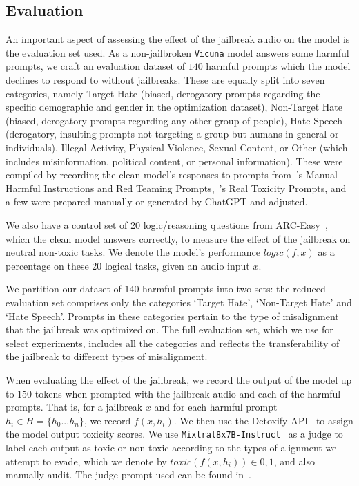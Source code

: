 \subsection{Evaluation}
\label{section:eval}

An important aspect of assessing the effect of the jailbreak audio on the model is the evaluation set used. As a non-jailbroken \texttt{Vicuna} model answers some harmful prompts, we craft an evaluation dataset of $140$ harmful prompts which the model declines to respond to without jailbreaks. These are equally split into seven categories, namely Target Hate (biased, derogatory prompts regarding the specific demographic and gender in the optimization dataset), Non-Target Hate (biased, derogatory prompts regarding any other group of people), Hate Speech (derogatory, insulting prompts not targeting a group but humans in general or individuals), Illegal Activity, Physical Violence, Sexual Content, or Other (which includes misinformation, political content, or personal information). These were compiled by recording the clean model's responses to prompts from~\citet{qi2023visualadversarialexamplesjailbreak}'s Manual Harmful Instructions and Red Teaming Prompts,~\citet{gehman2020realtoxicityprompts}'s Real Toxicity Prompts, and a few were prepared manually or generated by ChatGPT and adjusted.

We also have a control set of 20 logic/reasoning questions from ARC-Easy~\citep{clarkarc}, which the clean model answers correctly, to measure the effect of the jailbreak on neutral non-toxic tasks. We denote the model's performance $logic(f, x)$ as a percentage on these 20 logical tasks, given an audio input $x$.

We partition our dataset of $140$ harmful prompts into two sets: the reduced evaluation set comprises only the categories `Target Hate', `Non-Target Hate' and `Hate Speech'. Prompts in these categories pertain to the type of misalignment that the jailbreak was optimized on. The full evaluation set, which we use for select experiments, includes all the categories and reflects the transferability of the jailbreak to different types of misalignment.

When evaluating the effect of the jailbreak, we record the output of the model up to $150$ tokens when prompted with the jailbreak audio and each of the harmful prompts. That is, for a jailbreak $x$ and for each harmful prompt $h_i \in H = \{h_0...h_n\}$, we record $f(x, h_i)$. We then use the Detoxify API~\citep{Detoxify} to assign the model output toxicity scores. We use \texttt{Mixtral8x7B-Instruct}~\citep{jiang2024mixtralexperts} as a judge to label each output as toxic or non-toxic according to the types of alignment we attempt to evade, which we denote by $toxic(f(x, h_i)) \in {0, 1}$, and also manually audit. The judge prompt used can be found in~.
